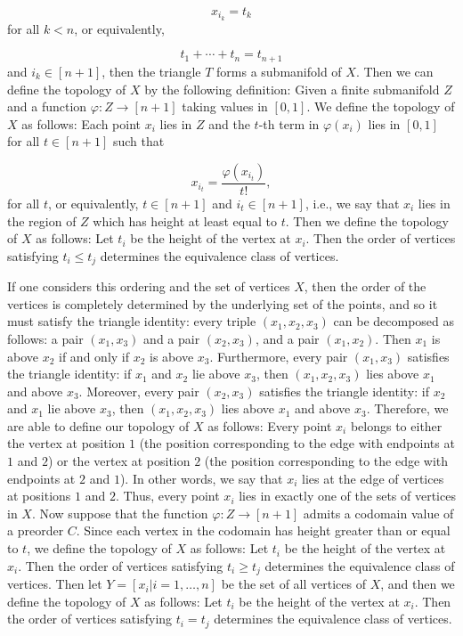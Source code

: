\documentclass[a4paper,reqno,oneside]{article}
\begin{document}
\[
x_{i_k} = t_k
\]
for all $k < n$, or equivalently, 

\[
t_1 + \cdots + t_n = t_{n+1}
\]
and $i_k \in [n+1]$, then the triangle $T$ forms a submanifold of $X$. Then we can define the topology of $X$ by the following definition: Given a finite submanifold $Z$ and a function $\varphi : Z \to [n+1]$ taking values in $[0, 1]$. We define the topology of $X$ as follows: Each point $x_i$ lies in $Z$ and the $t$-th term in $\varphi(x_{i})$ lies in $[0, 1]$ for all $t \in [n+1]$ such that

\[
x_{i_t} = \frac{\varphi(x_{i_t})}{t!},
\]
for all $t$, or equivalently, $t \in [n+1]$ and $i_t \in [n+1]$, i.e., we say that $x_i$ lies in the region of $Z$ which has height at least equal to $t$. Then we define the topology of $X$ as follows: Let $t_i$ be the height of the vertex at $x_i$. Then the order of vertices satisfying $t_i \leq t_j$ determines the equivalence class of vertices. 

If one considers this ordering and the set of vertices $X$, then the order of the vertices is completely determined by the underlying set of the points, and so it must satisfy the triangle identity: every triple $(x_1, x_2, x_3)$ can be decomposed as follows: a pair $(x_1, x_3)$ and a pair $(x_2, x_3)$, and a pair $(x_1, x_2)$. Then $x_1$ is above $x_2$ if and only if $x_2$ is above $x_3$. Furthermore, every pair $(x_1, x_3)$ satisfies the triangle identity: if $x_1$ and $x_2$ lie above $x_3$, then $(x_1, x_2, x_3)$ lies above $x_1$ and above $x_3$. Moreover, every pair $(x_2, x_3)$ satisfies the triangle identity: if $x_2$ and $x_1$ lie above $x_3$, then $(x_1, x_2, x_3)$ lies above $x_1$ and above $x_3$. Therefore, we are able to define our topology of $X$ as follows: Every point $x_i$ belongs to either the vertex at position $1$ (the position corresponding to the edge with endpoints at $1$ and $2$) or the vertex at position $2$ (the position corresponding to the edge with endpoints at $2$ and $1$). In other words, we say that $x_i$ lies at the edge of vertices at positions $1$ and $2$. Thus, every point $x_i$ lies in exactly one of the sets of vertices in $X$. 
Now suppose that the function $\varphi : Z \to [n+1]$ admits a codomain value of a preorder $C$. Since each vertex in the codomain has height greater than or equal to $t$, we define the topology of $X$ as follows: Let $t_i$ be the height of the vertex at $x_i$. Then the order of vertices satisfying $t_i \geq t_j$ determines the equivalence class of vertices. Then let $Y = [x_i | i = 1, \ldots, n]$ be the set of all vertices of $X$, and then we define the topology of $X$ as follows: Let $t_i$ be the height of the vertex at $x_i$. Then the order of vertices satisfying $t_i = t_j$ determines the equivalence class of vertices. 
\end{document}
